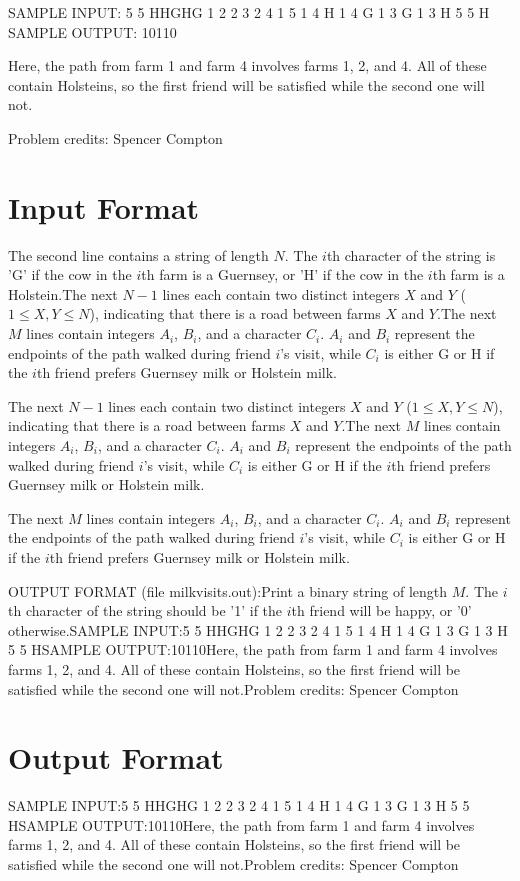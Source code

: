 \documentclass[12pt]{article}
\begin{document}
SAMPLE INPUT:
5 5
HHGHG
1 2
2 3
2 4
1 5
1 4 H
1 4 G
1 3 G
1 3 H
5 5 H
SAMPLE OUTPUT: 
10110

Here, the path from farm 1 and farm 4 involves farms 1, 2, and 4. All of these
contain Holsteins, so the first friend will be satisfied while the second one
will not.


Problem credits: Spencer Compton



\section*{Input Format}
The second line contains a string of length $N$. The $i$th character of the
string is 'G' if the cow in the $i$th farm is a Guernsey, or 'H' if the cow in
the $i$th farm is a Holstein.The next $N-1$ lines each contain two distinct integers $X$ and $Y$ 
($1 \leq X, Y \leq N$), indicating that there is a road between farms $X$ and
$Y$.The next $M$ lines contain integers $A_i$, $B_i$, and a character $C_i$. $A_i$
and $B_i$ represent the endpoints of the path walked during friend $i$'s visit, 
while $C_i$ is either G or H if the $i$th friend prefers Guernsey milk or
Holstein milk.

The next $N-1$ lines each contain two distinct integers $X$ and $Y$ 
($1 \leq X, Y \leq N$), indicating that there is a road between farms $X$ and
$Y$.The next $M$ lines contain integers $A_i$, $B_i$, and a character $C_i$. $A_i$
and $B_i$ represent the endpoints of the path walked during friend $i$'s visit, 
while $C_i$ is either G or H if the $i$th friend prefers Guernsey milk or
Holstein milk.

The next $M$ lines contain integers $A_i$, $B_i$, and a character $C_i$. $A_i$
and $B_i$ represent the endpoints of the path walked during friend $i$'s visit, 
while $C_i$ is either G or H if the $i$th friend prefers Guernsey milk or
Holstein milk.

OUTPUT FORMAT (file milkvisits.out):Print a binary string of length $M$. The $i$th character of the string should be
'1' if the $i$th friend will be happy, or '0' otherwise.SAMPLE INPUT:5 5
HHGHG
1 2
2 3
2 4
1 5
1 4 H
1 4 G
1 3 G
1 3 H
5 5 HSAMPLE OUTPUT:10110Here, the path from farm 1 and farm 4 involves farms 1, 2, and 4. All of these
contain Holsteins, so the first friend will be satisfied while the second one
will not.Problem credits: Spencer Compton

\section*{Output Format}
SAMPLE INPUT:5 5
HHGHG
1 2
2 3
2 4
1 5
1 4 H
1 4 G
1 3 G
1 3 H
5 5 HSAMPLE OUTPUT:10110Here, the path from farm 1 and farm 4 involves farms 1, 2, and 4. All of these
contain Holsteins, so the first friend will be satisfied while the second one
will not.Problem credits: Spencer Compton
\end{document}
